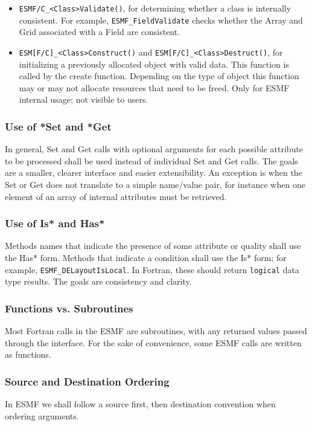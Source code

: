 \begin{itemize}
\item {\tt ESMF/C\_<Class>Validate()}, for determining whether a class is 
internally consistent.  For example, {\tt ESMF\_FieldValidate} checks 
whether the Array and Grid associated with a Field are consistent.
  
\item{\tt ESM[F/C]\_<Class>Construct()} and {\tt ESM[F/C]\_<Class>Destruct()},
for initializing a previously allocated object with valid data.  This 
function is called by the create function.  Depending on the type of 
object this function may or may not allocate resources that need to be freed.  
Only for ESMF internal usage; not visible to users.

\end{itemize}

\subsubsection{Use of *Set and *Get} In general, Set and Get calls with optional arguments
for each possible attribute to be processed shall be used instead of individual
Set and Get calls.  The goals are a smaller, clearer interface and easier extensibility.
An exception is when the Set or Get does not translate to a simple name/value pair,
for instance when one element of an array of internal attributes must be retrieved.

\subsubsection{Use of Is* and Has*} Methods names that indicate the 
presence of some attribute or quality shall use the Has* form.  Methods 
that indicate a condition shall use the Is* form; for example, 
{\tt ESMF\_DELayoutIsLocal}.  In Fortran, these should return {\tt logical}
data type results.  The goals are consistency and clarity.

\subsubsection{Functions vs. Subroutines}
Most Fortran calls in the ESMF are subroutines, with 
any returned values passed through the interface.  For the sake of 
convenience, some ESMF calls are written as functions.

\subsubsection{Source and Destination Ordering}
In ESMF we shall follow a source first, then destination convention when ordering
arguments.


